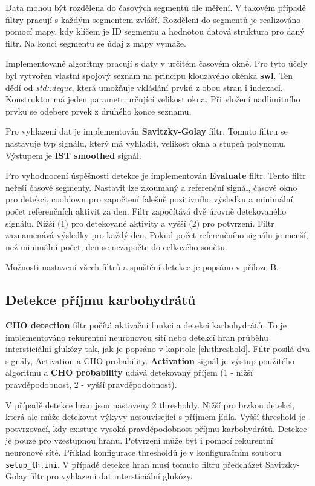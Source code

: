 Data mohou být rozdělena do časových segmentů dle měření. V takovém případě filtry pracují s každým segmentem zvlášť. Rozdělení do segmentů je realizováno pomocí mapy, kdy klíčem je ID segmentu a hodnotou datová struktura pro daný filtr. Na konci segmentu se údaj z mapy vymaže.

Implementované algoritmy pracují s daty v určitém časovém okně. Pro tyto účely byl vytvořen vlastní spojový seznam na principu klouzavého okénka \textbf{swl}. Ten dědí od \textit{std::deque}, která umožňuje vkládání prvků z obou stran i indexaci. Konstruktor má jeden parametr určující velikost okna. Při vložení nadlimitního prvku se odebere prvek z druhého konce seznamu.

Pro vyhlazení dat je implementován \textbf{Savitzky-Golay} filtr. Tomuto filtru se nastavuje typ signálu, který má vyhladit, velikost okna a stupeň polynomu. Výstupem je \textbf{IST smoothed} signál.

Pro vyhodnocení úspěšnosti detekce je implementován \textbf{Evaluate} filtr. Tento filtr neřeší časové segmenty. Nastavit lze zkoumaný a referenční signál, časové okno pro detekci, cooldown pro započtení falešně pozitivního výsledku a minimální počet referenčních aktivit za den. Filtr započítává dvě úrovně detekovaného signálu. Nižší (1) pro detekované aktivity a vyšší (2) pro potvrzení. Filtr zaznamenává výsledky pro každý den. Pokud počet referenčního signálu je menší, než minimální počet, den se nezapočte do celkového součtu.

Možnosti nastavení všech filtrů a spuštění detekce je popsáno v příloze B.


\subsection{Detekce příjmu karbohydrátů}

\textbf{CHO detection} filtr počítá aktivační funkci a detekci karbohydrátů. To je implementováno rekurentní neuronovou sítí nebo detekcí hran průběhu intersticiální glukózy tak, jak je popsáno v kapitole \ref{ch:threshold}. Filtr posílá dva signály, Activation a CHO probability. \textbf{Activation} signál je výstup použitého algoritmu a \textbf{CHO probability} udává detekovaný příjem (1 - nižší pravděpodobnost, 2 - vyšší pravděpodobnost).

V případě detekce hran jsou nastaveny 2 thresholdy. Nižší pro brzkou detekci, která ale může detekovat výkyvy nesouvisející s příjmem jídla. Vyšší threshold je potvrzovací, kdy existuje vysoká pravděpodobnost příjmu karbohydrátů. Detekce je pouze pro vzestupnou hranu. Potvrzení může být i pomocí rekurentní neuronové sítě. Příklad konfigurace thresholdů je v konfiguračním souboru \texttt{setup\_th.ini}. V případě detekce hran musí tomuto filtru předcházet Savitzky-Golay filtr pro vyhlazení dat intersticiální glukózy.

